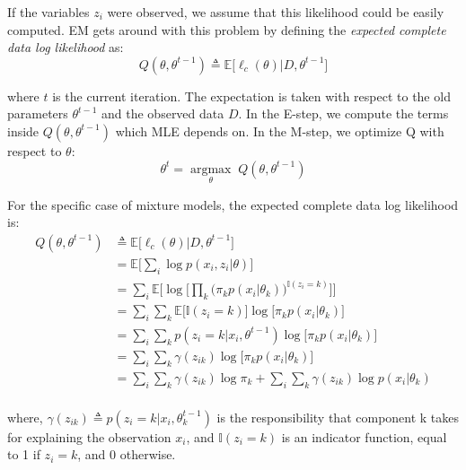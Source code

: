 If the variables $z_{i}$ were observed, we assume that this likelihood could be easily computed. EM gets around with this problem by defining the \emph{expected complete data log likelihood} as:
\begin{equation} \label{log-lik-expected-f}
		Q(\theta, \theta^{t-1}) \triangleq \mathbb{E} \big[\ell_{c}(\theta) | D, \theta^{t-1}\big]
\end{equation}

where $t$ is the current iteration. The expectation is taken with respect to the old parameters $\theta^{t-1}$ and the observed data $D$. In the E-step, we compute the terms inside $Q(\theta, \theta^{t-1})$ which MLE depends on. In the M-step, we optimize Q with respect to $\theta$:
\begin{equation} \label{log-lik-observed-f}
	\theta^{t} = \underset{\theta}{\operatorname{argmax}} \; Q(\theta, \theta^{t-1})
\end{equation}

For the specific case of mixture models, the expected complete data log likelihood is:
\begin{equation} \label{log-lik-expected-f}
	\begin{split}
		Q(\theta, \theta^{t-1}) & \triangleq \mathbb{E} \big[\ell_{c}(\theta) | D, \theta^{t-1}\big] \\
								& = \mathbb{E} \bigg[ \sum_{i} \log p(x_{i}, z_{i}|\theta) \bigg] \\
								& = \sum_{i} \mathbb{E} \bigg[ \log \bigg[\prod_{k} \big( \pi_{k}p(x_{i}|\theta_{k})\big)^{\mathbb{I}(z_{i}=k)} \bigg]\bigg] \\
								& = \sum_{i} \sum_{k} \mathbb{E} \big[\mathbb{I}(z_{i}=k)\big] \log \big[\pi_{k}p(x_{i}|\theta_{k})\big] \\
								& = \sum_{i} \sum_{k} p(z_{i}=k|x_{i},\theta^{t-1}) \log \big[\pi_{k}p(x_{i}|\theta_{k})\big] \\
								& = \sum_{i} \sum_{k} \gamma(z_{ik}) \log \big[\pi_{k}p(x_{i}|\theta_{k})\big] \\
								& = \sum_{i} \sum_{k} \gamma(z_{ik}) \log \pi_{k} + \sum_{i} \sum_{k} \gamma(z_{ik}) \log p(x_{i}|\theta_{k}) \\		
	\end{split}
\end{equation}

where, $\gamma(z_{ik}) \triangleq p(z_{i}=k|x_{i},\theta_{k}^{t-1})$ is the responsibility that component k takes for explaining the observation $x_{i}$, and $\mathbb{I}(z_{i}=k)$ is an indicator function, equal to 1 if $z_{i}=k$, and 0 otherwise.

